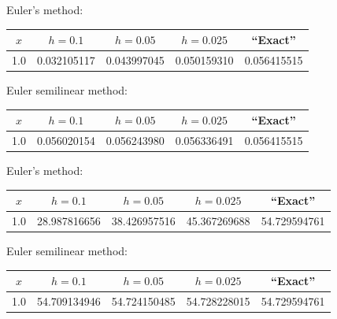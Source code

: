 \bigskip

{\small Euler's method:
\begin{tabular}{|c|r|r|r|r|}
\hline
\multicolumn{1}{|c|}{$x$}&
\multicolumn{1}{|c|}{$h=0.1$}&
\multicolumn{1}{|c|}{$h=0.05$}&
\multicolumn{1}{|c|}{$h=0.025$}&
\multicolumn{1}{|c|}{``Exact''}\\ \hline
1.0 & 0.032105117 & 0.043997045 & 0.050159310 & 0.056415515 \\
\hline
\end{tabular}}

\bigskip

\hspace{.75in}
{\small Euler semilinear method:
\begin{tabular}{|c|r|r|r|r|}
\hline
\multicolumn{1}{|c|}{$x$}&
\multicolumn{1}{|c|}{$h=0.1$}&
\multicolumn{1}{|c|}{$h=0.05$}&
\multicolumn{1}{|c|}{$h=0.025$}&
\multicolumn{1}{|c|}{``Exact''}\\ \hline
1.0 & 0.056020154 & 0.056243980 & 0.056336491 & 0.056415515 \\
\hline
\end{tabular}}

\bigskip

{\small Euler's method:
\begin{tabular}{|c|r|r|r|r|}
\hline
\multicolumn{1}{|c|}{$x$}&
\multicolumn{1}{|c|}{$h=0.1$}&
\multicolumn{1}{|c|}{$h=0.05$}&
\multicolumn{1}{|c|}{$h=0.025$}&
\multicolumn{1}{|c|}{``Exact''}\\ \hline
1.0 & 28.987816656 & 38.426957516 & 45.367269688 & 54.729594761 \\
\hline
\end{tabular}}

\bigskip

\hspace{.75in}
{\small Euler semilinear method:
\begin{tabular}{|c|r|r|r|r|}
\hline
\multicolumn{1}{|c|}{$x$}&
\multicolumn{1}{|c|}{$h=0.1$}&
\multicolumn{1}{|c|}{$h=0.05$}&
\multicolumn{1}{|c|}{$h=0.025$}&
\multicolumn{1}{|c|}{``Exact''}\\ \hline
1.0 & 54.709134946  & 54.724150485 & 54.728228015 & 54.729594761 \\
\hline
\end{tabular}}

\bigskip

